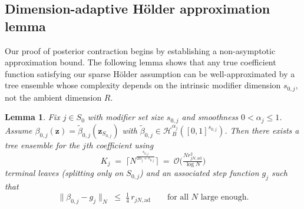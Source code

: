 \documentclass[11pt]{article}
\theoremstyle{plain}
\newtheorem{lemma}{Lemma}
\theoremstyle{definition}
\theoremstyle{plain}
\begin{document}
\subsection{Dimension-adaptive H\"older approximation lemma}
Our proof of posterior contraction begins by establishing a non-asymptotic approximation bound. The following lemma shows that any true coefficient function satisfying our sparse H\"older assumption can be well-approximated by a tree ensemble whose complexity depends on the intrinsic modifier dimension $s_{0,j},$ not the ambient dimension $R$.
\begin{lemma}
\label{lem:approx-main}
Fix $j\in S_0$ with modifier set size $s_{0,j}$ and smoothness $0<\alpha_j\le 1$.
Assume $\beta_{0,j}(\bm{z})=\tilde\beta_{0,j}(\bm{z}_{S_{0,j}})$ with
$\tilde\beta_{0,j}\in \mathcal H^{\alpha_j}_B([0,1]^{s_{0,j}})$.
Then there exists a tree ensemble for the $j$th coefficient using
\[
K_j \;=\; \Big\lceil N^{\frac{s_{0,j}}{2\alpha_j+s_{0,j}}}\Big\rceil
\ =\ \mathcal O \Big(\tfrac{N r_{jN,\mathrm{ad}}^2}{\log N}\Big)
\]
terminal leaves (splitting only on $S_{0,j}$) and an associated step function $g_j$ such that
\[
\|\beta_{0,j}-g_j\|_N \;\le\; \tfrac{1}{4}\,r_{jN,\mathrm{ad}}
\qquad\text{for all $N$ large enough.}
\]
\end{lemma}
\end{document}
